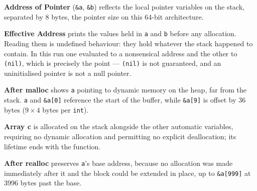 
\textbf{Address of Pointer} (\texttt{\&a}, \texttt{\&b}) reflects the local
pointer variables on the stack, separated by 8 bytes, the pointer size on this
64-bit architecture.

\textbf{Effective Address} prints the values held in \texttt{a} and \texttt{b}
before any allocation. Reading them is undefined behaviour: they hold whatever
the stack happened to contain. In this run one evaluated to a nonsensical
address and the other to \texttt{(nil)}, which is precisely the point ---
\texttt{(nil)} is not guaranteed, and an uninitialised pointer is not a null
pointer.

\textbf{After malloc} shows \texttt{a} pointing to dynamic memory on the heap,
far from the stack. \texttt{a} and \texttt{\&a[0]} reference the start of the
buffer, while \texttt{\&a[9]} is offset by 36 bytes ($9 \times 4$ bytes per
\texttt{int}).

\textbf{Array c} is allocated on the stack alongside the other automatic
variables, requiring no dynamic allocation and permitting no explicit
deallocation; its lifetime ends with the function.

\textbf{After realloc} preserves \texttt{a}'s base address, because no
allocation was made immediately after it and the block could be extended in
place, up to \texttt{\&a[999]} at 3996 bytes past the base.
